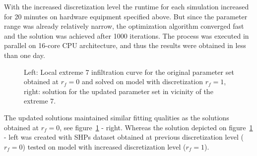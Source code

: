 \documentclass[review,times,3p,twocolumn,10pt]{elsarticle}
\begin{document}
With the increased discretization level the runtime for each simulation increased for 20 minutes on hardware equipment specified above. But since the parameter range was already relatively narrow, the optimization algorithm converged fast and the solution was achieved after 1000 iterations. The process was executed in parallel on 16-core CPU architecture, and thus the results were obtained in less than one day.

\begin{figure}
\caption{Left: Local extreme 7 infiltration curve for the original parameter set obtained at $r_f=0$ and solved on model with discretization $r_f=1$, right: solution for the updated parameter set in  vicinity of the extreme 7.}
\label{rf1examples}
\end{figure}

The updated solutions maintained similar fitting qualities as the solutions obtained at $r_f=0$, see figure~\ref{rf1examples} - right. Whereas the solution depicted on figure~\ref{rf1examples} - left was created with SHPs dataset obtained at previous discretization level ($r_f=0$) tested on model with increased discretization level ($r_f=1$).
\end{document}
